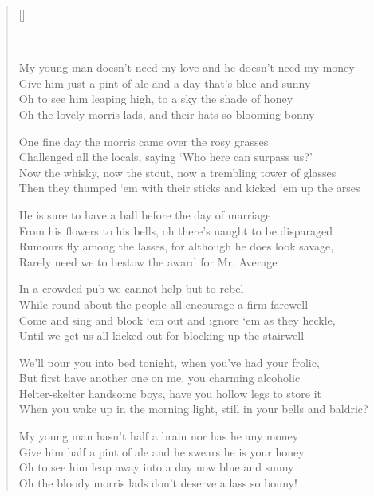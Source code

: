 \pagebreak
\settowidth{\versewidth}{Now the whisky, now the stout, now a trembling tower of glasses}
\begin{verse}[\versewidth]

\\
\begin{chorus}
My young man doesn't need my love and he doesn't need my money\\
Give him just a pint of ale and a day that's blue and sunny\\
Oh to see him leaping high, to a sky the shade of honey\\
Oh the lovely morris lads, and their hats so blooming bonny
\end{chorus}


One fine day the morris came over the rosy grasses\\
Challenged all the locals, saying `Who here can surpass us?'\\
Now the whisky, now the stout, now a trembling tower of glasses\\
Then they thumped `em with their sticks and kicked `em up the arses

He is sure to have a ball before the day of marriage\\
From his flowers to his bells, oh there's naught to be disparaged\\
Rumours fly among the lasses, for although he does look savage,\\
Rarely need we to bestow the award for Mr. Average

In a crowded pub we cannot help but to rebel\\
While round about the people all encourage a firm farewell\\
Come and sing and block `em out and ignore `em as they heckle,\\
Until we get us all kicked out for blocking up the stairwell

We'll pour you into bed tonight, when you've had your frolic,\\
But first have another one on me, you charming alcoholic\\
Helter-skelter handsome boys, have you hollow legs to store it\\
When you wake up in the morning light, still in your bells and baldric?

\begin{chorus}
My young man hasn't half a brain nor has he any money\\
Give him half a pint of ale and he swears he is your honey\\
Oh to see him leap away into a day now blue and sunny\\
Oh the bloody morris lads don't deserve a lass so bonny!
\end{chorus}

\end{verse}
